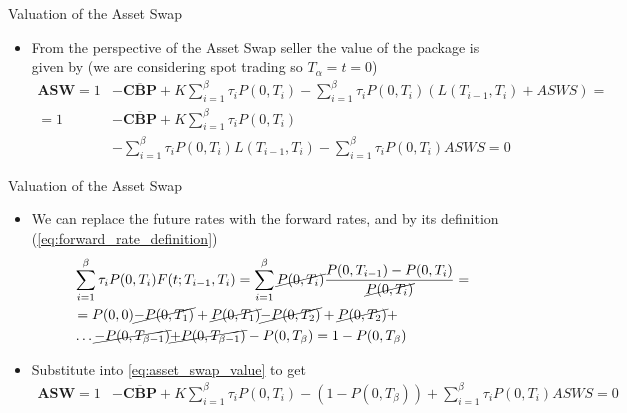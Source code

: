 \documentclass{beamer}
\begin{document}
\begin{frame}{Valuation of the Asset Swap}
	\begin{itemize}
		\item From the perspective of the Asset Swap seller the value of the package is given by (we are considering spot trading so $T_\alpha = t = 0$)
		\begin{equation}
			\begin{aligned}
				\textbf{ASW}=1&-\overline{\textbf{CBP}}+K\sum_{i=1}^{\beta}\tau_i P(0,T_i)-\sum_{i=1}^{\beta}\tau_i P(0,T_i)(L(T_{i-1},T_i)+ASWS) =\\
				=1&-\overline{\textbf{CBP}}+K\sum_{i=1}^{\beta}\tau_i P(0,T_i)\\
				&-\sum_{i=1}^{\beta}\tau_i P(0,T_i)L(T_{i-1},T_i)-\sum_{i=1}^{\beta}\tau_i P(0,T_i)ASWS=0
			\end{aligned}
			\label{eq:asset_swap_value}
		\end{equation}
	\end{itemize}
\end{frame}

\begin{frame}{Valuation of the Asset Swap}
	\begin{itemize}
		\item We can replace the future rates with the forward rates, and by its definition (\cref{eq:forward_rate_definition})
		\begin{equation*}
			\begin{aligned}
			&\sum_{i=1}^\beta \tau_i P(0,T_i)F(t;T_{i-1},T_i) =  \sum_{i=1}^\beta \cancel{P(0,T_i)}\frac{P(0,T_{i-1})-P(0,T_i)}{\cancel{P(0,T_i)}} = \\
			&= P(0,0) \cancel{- P(0,T_1)} + \cancel{P(0,T_1)} \cancel{- P(0,T_2)} + \cancel{P(0,T_2)} + \\
			&\ldots \cancel{- P(0, T_{\beta-1})} \cancel{+ P(0, T_{\beta-1})}-P(0,T_\beta) = 1-P(0,T_\beta) 
			\end{aligned}
		\end{equation*}
		\item Substitute into \cref{eq:asset_swap_value} to get
		\begin{equation*}
			\begin{aligned}
				\textbf{ASW}=1&-\overline{\textbf{CBP}}+K\sum_{i=1}^{\beta}\tau_i P(0,T_i) -(1-P(0,T_\beta))
				+ \sum_{i=1}^\beta\tau_i P(0,T_i)ASWS=0
			\end{aligned}
		\end{equation*}
	\end{itemize}
\end{frame}
\end{document}
